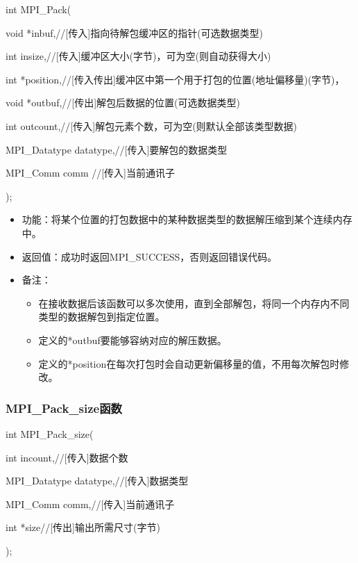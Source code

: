 \documentclass[UTF8]{article}%
\begin{document}
int MPI\_Pack(

    \qquad void            *inbuf,//[传入]指向待解包缓冲区的指针(可选数据类型) 

    \qquad int             insize,//[传入]缓冲区大小(字节)，可为空(则自动获得大小)

    \qquad int             *position,//[传入传出]缓冲区中第一个用于打包的位置(地址偏移量)(字节)，

    \qquad void            *outbuf,//[传出]解包后数据的位置(可选数据类型) 

    \qquad int             outcount,//[传入]解包元素个数，可为空(则默认全部该类型数据)

    \qquad MPI\_Datatype   datatype,//[传入]要解包的数据类型

    \qquad MPI\_Comm       comm //[传入]当前通讯子
    
);

\begin{itemize}
    \item 功能：将某个位置的打包数据中的某种数据类型的数据解压缩到某个连续内存中。
    \item 返回值：成功时返回MPI\_SUCCESS，否则返回错误代码。
    \item 备注：
    
    {
        \begin{itemize}
            \item 在接收数据后该函数可以多次使用，直到全部解包，将同一个内存内不同类型的数据解包到指定位置。
            \item 定义的*outbuf要能够容纳对应的解压数据。
            \item 定义的*position在每次打包时会自动更新偏移量的值，不用每次解包时修改。
        \end{itemize}
    }
\end{itemize}

\subsubsection{MPI\_Pack\_size函数}

int MPI\_Pack\_size(

    \qquad int           incount,//[传入]数据个数

    \qquad MPI\_Datatype datatype,//[传入]数据类型

    \qquad MPI\_Comm     comm,//[传入]当前通讯子

    \qquad int           *size//[传出]输出所需尺寸(字节)

);
\end{document}
